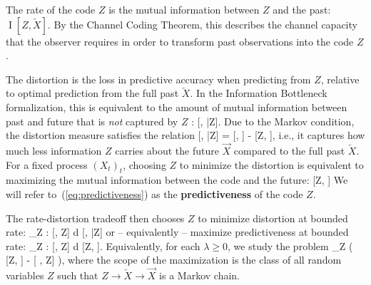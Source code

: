 \documentclass[entropy,article,submit,moreauthors,pdftex,10pt,a4paper]{Definitions/mdpi}
\newif \ifcomment
\newcommand\rljf[1]{\ifcomment{{\color{blue}(#1)}}\else{}\fi}
\newcommand{\future}{\overrightarrow{X}}
\newcommand{\past}{\overleftarrow{X}}
\newcommand{\key}{\textbf}
\let\oldequation\equation
\let\oldendequation\endequation
\renewenvironment{equation}
  {\linenomathNonumbers\oldequation}
  {\oldendequation\endlinenomath}
\begin{document}
The rate of the code $Z$ is the mutual information between $Z$ and the past: $\operatorname{I}[Z, \past]$.
By the Channel Coding Theorem, this describes the channel capacity that the observer requires in order to transform past observations into the code $Z$.

The distortion is the loss in predictive accuracy when predicting from $Z$, relative to optimal prediction from the full past $\past$.
In the Information Bottleneck formalization, this is equivalent to the amount of mutual information between past and future that is \emph{not} captured by $Z$ \citep{harremoes2007information}: %
\begin{equation}
	[\past, \future|Z].
\end{equation}
Due to the Markov condition, the distortion measure satisfies the relation
\begin{equation}
	[\past, \future|Z] = [\past, \future] - [Z, \future],
\end{equation}
i.e., it captures how much less information $Z$ carries about the future $\future$ compared to the full past $\past$.
For a fixed process $(X_t)_t$, choosing $Z$ to minimize the distortion is equivalent to maximizing the mutual information between the code and the future:
\begin{equation}\label{eq:predictiveness}
[Z, \future]
\end{equation}
We will refer to~(\ref{eq:predictiveness}) as the \key{predictiveness} of the code $Z$.

The rate-distortion tradeoff then chooses $Z$ to %
 minimize distortion at bounded rate:
\begin{equation}
\min_{Z :  [\past, Z] \leq d}  [\past, \future|Z] 
\end{equation}
or -- equivalently -- maximize predictiveness at bounded rate:
\begin{equation}
\max_{Z :  [\past, Z] \leq d}  [Z, \future].
\end{equation}
Equivalently, for each  $\lambda \geq 0$, we study the problem 
\begin{equation}\label{eq:ib}
	\max_{Z} \left( [Z, \future] - \lambda \cdot {}[ \past, Z] \right),
\end{equation}
where the scope of the maximization is the class of all random variables $Z$ such that $Z \rightarrow \past \rightarrow \future$ is a Markov chain. %
\end{document}
